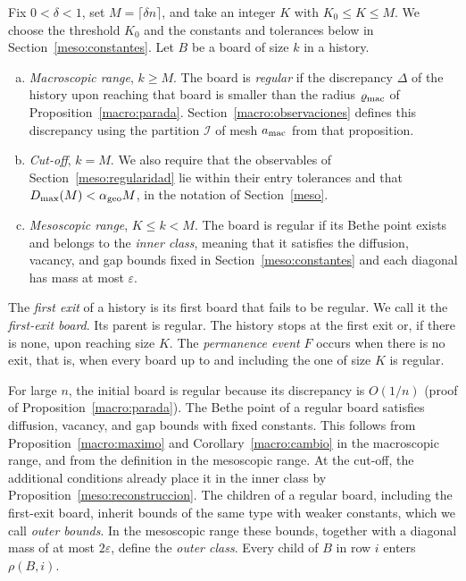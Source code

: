 \begin{definicion}\label{def:regular}
Fix $0<\delta<1$, set $M=\lceil\delta n\rceil$, and take an integer $K$ with $K_0\le K\le M$. We choose the
threshold $K_0$ and the constants and tolerances below in Section~\ref{meso:constantes}. Let $B$ be a board
of size $k$ in a history.
\begin{enumerate}[(a)]
\item \emph{Macroscopic range}, $k\ge M$. The board is \emph{regular} if the discrepancy $\Delta$ of the
history upon reaching that board is smaller than the radius $\varrho_{\rm mac}$ of
Proposition~\ref{macro:parada}.
Section~\ref{macro:observaciones} defines this discrepancy using the partition $\mathcal I$ of mesh $a_{\rm
mac}$ from that proposition.
\item \emph{Cut-off}, $k=M$. We also require that the observables of Section~\ref{meso:regularidad} lie
within their entry tolerances and that $D_{\max}(M)<\alpha_{\rm geo}M$, in the notation of
Section~\ref{meso}.
\item \emph{Mesoscopic range}, $K\le k<M$. The board is regular if its Bethe point exists and belongs to the
\emph{inner class}, meaning that it satisfies the diffusion, vacancy, and gap bounds fixed in
Section~\ref{meso:constantes} and each diagonal has mass at most $\varepsilon$.
\end{enumerate}
The \emph{first exit} of a history is its first board that fails to be regular. We call it the
\emph{first-exit board}. Its parent is regular. The history stops at the first exit or, if there is none,
upon reaching size $K$. The \emph{permanence event} $F$ occurs when there is no exit, that is, when every
board up to and including the one of size $K$ is regular.
\end{definicion}
For large $n$, the initial board is regular because its discrepancy is $O(1/n)$ (proof of
Proposition~\ref{macro:parada}). The Bethe point of a regular board satisfies diffusion, vacancy, and gap
bounds with fixed constants. This follows from Proposition~\ref{macro:maximo} and
Corollary~\ref{macro:cambio} in the macroscopic range, and from the definition in the mesoscopic range. At
the cut-off, the additional conditions already place it in the inner class by
Proposition~\ref{meso:reconstruccion}. The children of a regular board, including the first-exit
board, inherit bounds of the same type with weaker constants, which we call \emph{outer bounds}. In
the mesoscopic range these bounds, together with a diagonal mass of at most $2\varepsilon$, define
the \emph{outer class}. Every child of $B$ in row $i$ enters $\rho(B,i)$.

